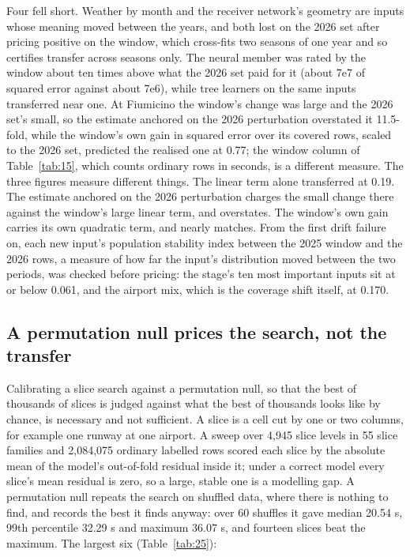 \documentclass[
  manuscript=article,
  layout=preprint,
  year=2026,
  volume=x,
]{extra/joas}
\begin{document}
Four fell short. Weather by month and the receiver network's geometry are inputs whose meaning moved between the years, and both lost on the 2026 set after pricing positive on the window, which cross-fits two seasons of one year and so certifies transfer across seasons only. The neural member was rated by the window about ten times above what the 2026 set paid for it (about 7e7 of squared error against about 7e6), while tree learners on the same inputs transferred near one. At Fiumicino the window's change was large and the 2026 set's small, so the estimate anchored on the 2026 perturbation overstated it 11.5-fold, while the window's own gain in squared error over its covered rows, scaled to the 2026 set, predicted the realised one at 0.77; the window column of Table~\ref{tab:15}, which counts ordinary rows in seconds, is a different measure. The three figures measure different things. The linear term alone transferred at 0.19. The estimate anchored on the 2026 perturbation charges the small change there against the window's large linear term, and overstates. The window's own gain carries its own quadratic term, and nearly matches. From the first drift failure on, each new input's population stability index between the 2025 window and the 2026 rows, a measure of how far the input's distribution moved between the two periods, was checked before pricing: the stage's ten most important inputs sit at or below 0.061, and the airport mix, which is the coverage shift itself, at 0.170.

\subsection{A permutation null prices the search, not the transfer}\label{sec:E.3}

Calibrating a slice search against a permutation null, so that the best of thousands of slices is judged against what the best of thousands looks like by chance, is necessary and not sufficient. A slice is a cell cut by one or two columns, for example one runway at one airport. A sweep over 4,945 slice levels in 55 slice families and 2,084,075 ordinary labelled rows scored each slice by the absolute mean of the model's out-of-fold residual inside it; under a correct model every slice's mean residual is zero, so a large, stable one is a modelling gap. A permutation null repeats the search on shuffled data, where there is nothing to find, and records the best it finds anyway: over 60 shuffles it gave median 20.54 s, 99th percentile 32.29 s and maximum 36.07 s, and fourteen slices beat the maximum. The largest six (Table~\ref{tab:25}):
\end{document}
